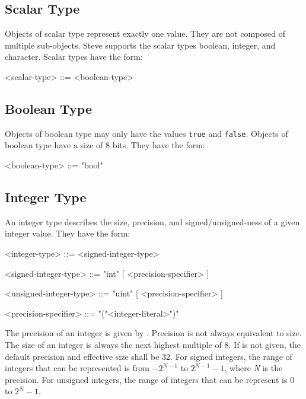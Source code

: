 \subsection{Scalar Type} \label{guide:scalar_type}

Objects of scalar type represent exactly one value. They are not composed of multiple sub-objects. Steve supports the scalar types boolean, integer, and character. Scalar types have the form:

\begin{minip}
\begin{grammar}
<scalar-type> ::= <boolean-type>
\end{grammar}
\end{minip}

\subsection{Boolean Type} \label{guide:bool_type}

Objects of boolean type may only have the values \texttt{true} and \texttt{false}. Objects of boolean type have a size of 8 bits. They have the form:

\begin{minip}
\begin{grammar}
<boolean-type> ::= "bool"
\end{grammar}
\end{minip}

\subsection{Integer Type} \label{guide:integer_type}

An integer type describes the size, precision, and signed/unsigned-ness of a given integer value. They have the form:

\begin{minip}
\begin{grammar}
<integer-type> ::= <signed-integer-type>

<signed-integer-type> ::= "int" [ <precision-specifier> ]

<unsigned-integer-type> ::= "uint" [ <precision-specifier> ]

<precision-specifier> ::= "("<integer-literal>")"
\end{grammar}
\end{minip}

The precision of an integer is given by .
Precision is not always equivalent to size. The size of an integer is
always the next highest multiple of 8.
If  is not given, the default precision and effective size shall be 32. For signed integers, the range of integers that can be represented is from $-2^{N-1}$ to $2^{N-1}-1$, where \textit{N} is the precision. For unsigned integers, the range of integers that can be represent is $0$ to $2^{N}-1$.

